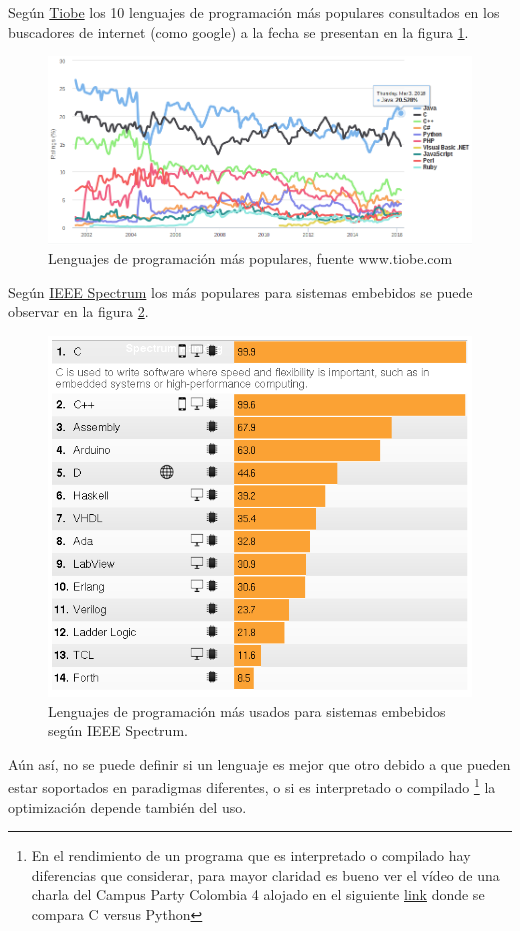 \documentclass{article}
\begin{document}
Según \href{http://www.tiobe.com/tiobe_index?page=index}{Tiobe} los 10
lenguajes de programación más populares consultados en los buscadores
de internet (como google) a la fecha se presentan en la figura \ref{fig:lenguajes1}.

\begin{figure}[hptp]
    \centering
    \includegraphics[scale=0.4]{imag/lenguajes1.png}
    \caption{Lenguajes de programación más populares, fuente www.tiobe.com}
    \label{fig:lenguajes1}
\end{figure}
\smallskip

Según \href{spectrum.ieee.org}{IEEE Spectrum} los más populares para
sistemas embebidos se puede observar en la figura \ref{fig:lenguajes2}.

\begin{figure}[hptp]
    \centering
    \includegraphics[scale=0.4]{imag/lenguajes2.png}
    \caption{Lenguajes de programación más usados para sistemas
	embebidos según IEEE Spectrum.}
    \label{fig:lenguajes2}
\end{figure}
\smallskip

Aún así, no se puede definir si un lenguaje es mejor que otro debido a que
pueden estar soportados en paradigmas diferentes, o si es interpretado o
compilado \footnote{En el rendimiento de un programa que es interpretado
		o compilado hay diferencias que considerar, para mayor claridad 
		es bueno ver el vídeo de una charla del Campus Party Colombia 4 
		alojado en el siguiente \href{https://www.youtube.com/watch?v=cPVlYWxcu18}{link} donde se compara C versus Python}
la optimización depende también del uso.
\end{document}
